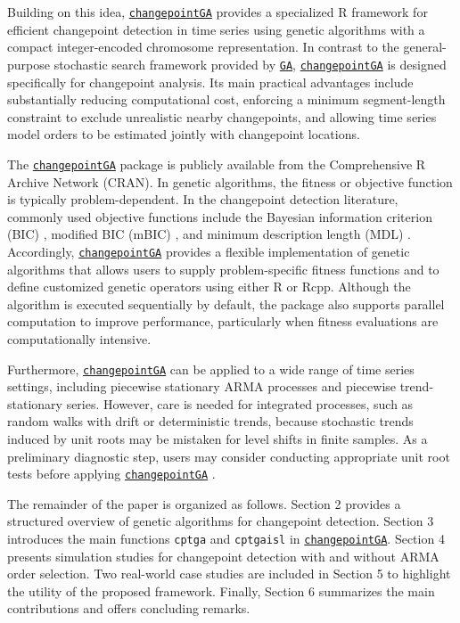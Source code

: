 Building on this idea, \href{https://CRAN.R-project.org/package=changepointGA}{\texttt{changepointGA}} provides a specialized R framework for efficient changepoint detection in time series using genetic algorithms with a compact integer-encoded chromosome representation. In contrast to the general-purpose stochastic search framework provided by \href{https://CRAN.R-project.org/package=GA}{\texttt{GA}}, \href{https://CRAN.R-project.org/package=changepointGA}{\texttt{changepointGA}} is designed specifically for changepoint analysis. Its main practical advantages include substantially reducing computational cost, enforcing a minimum segment-length constraint to exclude unrealistic nearby changepoints, and allowing time series model orders to be estimated jointly with changepoint locations.

The \href{https://CRAN.R-project.org/package=changepointGA}{\texttt{changepointGA}} package is publicly available from the Comprehensive R Archive Network (CRAN). In genetic algorithms, the fitness or objective function is typically problem-dependent. In the changepoint detection literature, commonly used objective functions include the Bayesian information criterion (BIC) \citep{yao1988estimating}, modified BIC (mBIC) \citep{zhang2007modified}, and minimum description length (MDL) \citep{davis2006structural}. Accordingly, \href{https://CRAN.R-project.org/package=changepointGA}{\texttt{changepointGA}} provides a flexible implementation of genetic algorithms that allows users to supply problem-specific fitness functions and to define customized genetic operators using either R or Rcpp. Although the algorithm is executed sequentially by default, the package also supports parallel computation to improve performance, particularly when fitness evaluations are computationally intensive.

Furthermore, \href{https://CRAN.R-project.org/package=changepointGA}{\texttt{changepointGA}} can be applied to a wide range of time series settings, including piecewise stationary ARMA processes and piecewise trend-stationary series. However, care is needed for integrated processes, such as random walks with drift or deterministic trends, because stochastic trends induced by unit roots may be mistaken for level shifts in finite samples. As a preliminary diagnostic step, users may consider conducting appropriate unit root tests before applying \href{https://CRAN.R-project.org/package=changepointGA}{\texttt{changepointGA}} \citep{perron1989great, zivot1992further}.

The remainder of the paper is organized as follows. Section 2 provides a structured overview of genetic algorithms for changepoint detection. Section 3 introduces the main functions \texttt{cptga} and \texttt{cptgaisl} in \href{https://CRAN.R-project.org/package=changepointGA}{\texttt{changepointGA}}. Section 4 presents simulation studies for changepoint detection with and without ARMA order selection. Two real-world case studies are included in Section 5 to highlight the utility of the proposed framework. Finally, Section 6 summarizes the main contributions and offers concluding remarks.

